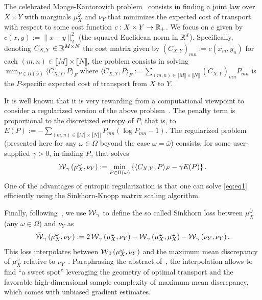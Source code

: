 The celebrated  Monge-Kantorovich problem~\cite[Chapter~2]{COT19}  consists in
finding a joint law over $X  \times Y$ with marginals $\mu_X^{\bar\omega}$ and
$\nu_Y$ that  minimizes the expected  cost of  transport with respect  to some
cost function $c :  X \times Y \rightarrow \mathbb{R}_+$.  We focus  on $c$ given by
$c(x,y)  :=  \|x-y\|_{2}^{2}$  (the  squared Euclidean  norm  in  $\mathbb{R}^{d}$).
Specifically, denoting $C_{X,Y}  \in \mathbb{R}^{M \times N}$ the  cost matrix given
by       $(C_{X,Y})_{mn}        :=       c(x_{m},y_{n})$        for       each
$(m,n) \in \llbracket M\rrbracket  \times \llbracket N\rrbracket$, the problem
consists in solving
$\min_{P \in \Pi(\bar\omega)} \langle C_{X,Y}, P \rangle_F$
where
$\langle C_{X,Y}, P \rangle_F := \sum_{(m,n) \in \llbracket M\rrbracket \times
  \llbracket N\rrbracket} (C_{X,Y})_{mn} P_{mn}$  is the $P$-specific expected
cost of transport from $X$ to $Y$.

It is well known  that it is very rewarding from  a computational viewpoint to
consider a  regularized version of the  above problem~\cite[Chapter~4]{COT19}.
The penalty term  is proportional to the discretized entropy  of $P$, that is,
to
$E(P)  :=   -  \sum_{(m,n)   \in  \llbracket  M\rrbracket   \times  \llbracket
  N\rrbracket]} P_{mn} (\log P_{mn}  -1)$.  The regularized problem (presented
here for  any $\omega  \in \Omega$  beyond the  case $\omega  = \bar{\omega}$)
consists, for  some user-supplied $\gamma  > 0$, in finding  $P_{\gamma}$ that
solves
\begin{equation}
  \label{eq:eq1}
  \operatorname{\mathcal{W}}_{\gamma}\left(\mu_X^{\omega}, \nu_Y \right) := \min_{P \in \Pi(\omega)}
  \left\{\langle C_{X,Y}, P \rangle_F - \gamma E(P)\right\}.  
\end{equation}
One  of the  advantages  of  entropic regularization  is  that  one can  solve
\eqref{eq:eq1} efficiently using the Sinkhorn-Knopp matrix scaling algorithm.

Finally, following~\cite{Genevay18}, we use  $\operatorname{\mathcal{W}}_{\gamma}$ to define the so
called Sinkhorn loss between $\mu_{X}^{\omega}$  (any $\omega \in \Omega$) and
$\nu_{Y}$ as
\begin{equation*}
  \bar{\operatorname{\mathcal{W}}}_{\gamma}\left(\mu_X^{\omega},        \nu_Y       \right)        :=       2
  \operatorname{\mathcal{W}}_{\gamma}\left(\mu_X^{\omega},         \nu_Y          \right)         -
  \operatorname{\mathcal{W}}_{\gamma}\left(\mu_X^{\omega},      \mu_X^{\omega}       \right)      -
  \operatorname{\mathcal{W}}_{\gamma}\left(\nu_Y, \nu_Y \right). 
\end{equation*}
This loss interpolates  between $\operatorname{\mathcal{W}}_{0}\left(\mu_X^{\omega}, \nu_Y \right)$
and   the   maximum  mean   discrepancy   of   $\mu_X^{\omega}$  relative   to
$\nu_Y$~\cite[Theorem~1]{Genevay18}.       Paraphrasing      the      abstract
of~\cite{Genevay18},  the  interpolation  allows  to  find  ``a  sweet  spot''
leveraging   the   geometry   of   optimal   transport   and   the   favorable
high-dimensional sample  complexity of  maximum mean discrepancy,  which comes
with unbiased gradient estimates.






